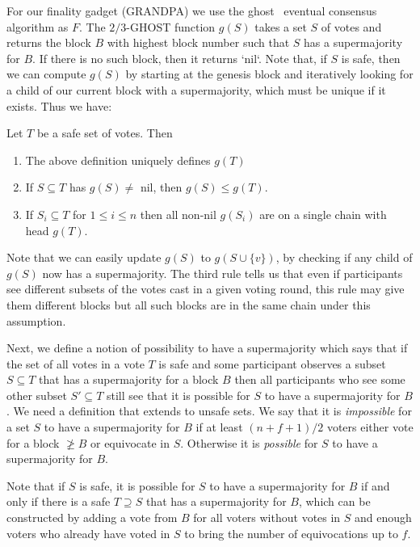 \documentclass[a4paper,UKenglish,cleveref, autoref, thm-restate, anonymous]{lipics-v2019}
\begin{document}
For our finality gadget (GRANDPA) we use the ghost~\cite{lewenberg15inclusive} eventual consensus algorithm as $F$.
The $2/3$-GHOST function $g(S)$ takes a set $S$ of votes and returns the block $B$ with highest block number such that $S$ has a supermajority for $B$.
If there is no such block, then it returns `nil`. 
Note that, if $S$ is safe, then we can compute $g(S)$ by starting at the genesis block and iteratively looking for a child of our current block with a supermajority, which must be unique if it exists. Thus we have:
\begin{lemma} \label{lem:ghost-monotonicity}
Let $T$ be a safe set of votes. Then
\begin{enumerate}
\item The above definition uniquely defines $g(T)$
\item If $S \subseteq T$ has $g(S) \neq$ nil, then $g(S) \leq g(T)$.
\item If $S_i \subseteq T$ for $1 \leq i \leq n$ then all non-nil $g(S_i)$ are on a single chain with head $g(T)$.
\end{enumerate}

\end{lemma}

Note that we can easily update $g(S)$ to $g(S \cup \{v\})$, by checking if any child of $g(S)$ now has a supermajority.
The third rule tells us that even if participants see different subsets of the votes cast in a given voting round, this rule may give them different blocks but all such blocks are in the same chain under this assumption. 

Next, we define a notion of possibility to have a supermajority which says that if the set of all votes in a vote $T$ is safe and some participant observes a subset $S \subseteq T$ that has a supermajority for a block $B$ then all participants who see some other subset $S' \subseteq T$ still see that it is possible for $S$ to have a supermajority for $B$. We need a definition that extends to unsafe sets.
We say that it is {\em impossible} for a set $S$ to have a supermajority for $B$ if at least $(n+f+1)/2$ voters either vote for a block $\not \geq B$ or equivocate in $S$. Otherwise it is {\em possible} for $S$ to have a supermajority for $B$.

Note that if $S$ is safe, it is possible for $S$ to have a supermajority for $B$ if and only if there is a safe $T \supseteq S$ that has a supermajority for $B$, which can be constructed by adding a vote from $B$ for all voters without votes in $S$ and enough voters who already have voted in $S$ to bring the number of equivocations up to $f$.
\end{document}
